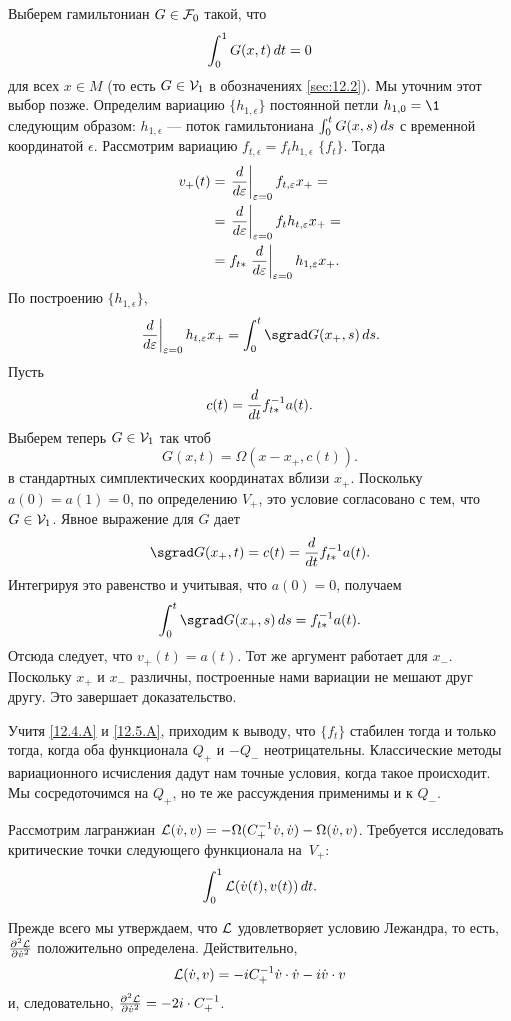 Выберем гамильтониан $G\in\mathcal{F}_0$ такой, что
\[\int_0^1G(x, t)\,d t = 0\]
для всех $x\in M$ (то есть $G\in\mathcal{V}_1$ в обозначениях \ref{sec:12.2}).
Мы уточним этот выбор позже.
Определим вариацию $\{h_{1,\epsilon}\}$ постоянной петли $h_{1,0} = \1$ следующим образом: $h_{1,\epsilon}$ --- поток гамильтониана $\int_0^tG(x,s)\,d s$ с временной координатой $\epsilon$.
Рассмотрим вариацию $f_{t,\epsilon} = f_th_{1,\epsilon}$  $\{f_t\}$.
Тогда
\begin{align*}
v_+(t) &= \left.\frac{d}{d \varepsilon}\right|_{\varepsilon=0} f_{t,\varepsilon} x_+ =
\\
&=\left.\frac{d}{d \varepsilon}\right|_{\varepsilon=0}f_th_{t,\varepsilon} x_+=
\\
&=
f_{t*} \left.\frac{d}{d \varepsilon}\right|_{\varepsilon=0} h_{1,\varepsilon} x_+.
\end{align*}
По построению $\{h_{1,\epsilon}\}$,
\[\left.\frac{\d}{\d \epsilon}\right|_{\epsilon=0}h_{t,\epsilon}x_+
=
\int_0^t\sgrad G(x_+,s)\,\d s.\]
Пусть 
\[c(t) = \frac{d}{d t}f^{-1}_{t*} a(t).\]
Выберем теперь $G \in \mathcal{V}_1$ так чтоб 
\[G(x, t) = \Omega(x - x_+, c(t)).\]
в стандартных симплектических координатах вблизи $x_+$.
Поскольку $a(0) = a(1) = 0$, по определению $V_+$, это условие согласовано с тем, что $G\in\mathcal{V}_1$.
Явное выражение для $G$ дает 
\[\sgrad G(x_+, t) = c(t) = \frac{\d}{\d t}f^{-1}_{t*} a(t).\]
Интегрируя это равенство и учитывая, что $a(0) = 0$, получаем
\[\int_0^t\sgrad G(x_+, s)\,\d s = f_{t*}^{-1}a(t).\]
Отсюда следует, что $v_+(t) = a(t)$.
Тот же аргумент работает для $x_-$.
Поскольку $x_+$ и $x_-$ различны, построенные нами вариации не мешают друг другу.
Это завершает доказательство.
\qeds

Учитя \ref{12.4.A} и \ref{12.5.A}, приходим к выводу, что  $\{f_t\}$ стабилен тогда и только тогда, когда оба функционала $Q_+$ и $-Q_-$ неотрицательны.
Классические методы вариационного исчисления дадут нам точные условия, когда такое происходит.
Мы сосредоточимся на $Q_+$, но те же рассуждения применимы и к $Q_-$.

Рассмотрим лагранжиан $\mathcal{L}(\dot v, v) = -\Omega(C_+^{-1}\dot v, \dot v) - \Omega(\dot v, v)$.
Требуется исследовать критические точки следующего функционала на~$V_+$:
\[\int_0^1 \mathcal{L}(\dot v(t), v(t))\,d t.\]

Прежде всего мы утверждаем, что $\mathcal{L}$ удовлетворяет условию Лежандра, то есть, $\tfrac{\partial^2\mathcal{L}}{\partial\dot v^2}$ положительно определена.
Действительно, 
\[\mathcal{L}( \dot v, v) = -iC_+^{-1} \dot v\cdot\dot v - i\dot v\cdot v\]
и, следовательно, $\tfrac{\partial^2\mathcal{L}}{\partial\dot v^2}= - 2i\cdot C_+^{-1}$.


